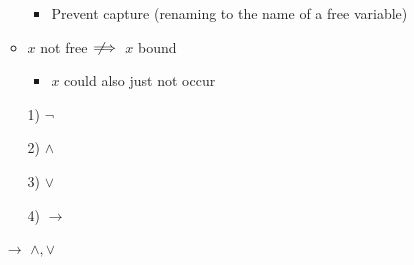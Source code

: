\begin{itemize}
\begin{itemize}
\begin{itemize}
                    \item Prevent capture (renaming to the name of a free variable)
                \end{itemize}
            \item $x$ not free $\;\not\!\!\!\implies$ $x$ bound
                \begin{itemize}
                    \item $x$ could also just not occur
                \end{itemize}
        \end{itemize}
        \begin{itemize}
            \item[1)] $\neg$
            \item[2)] $\wedge$
            \item[3)] $\vee$
            \item[4)] $\to$
        \end{itemize}
        \begin{itemize}
             $\to$
             $\wedge, \vee$
        \end{itemize}
\end{itemize}


